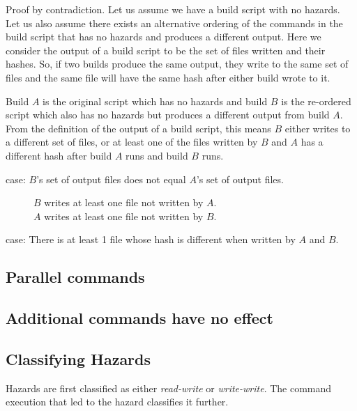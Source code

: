 
Proof by contradiction.  Let us assume we have a build script with no hazards.  Let us also assume there exists an alternative ordering of the commands in the build script that has no hazards
and produces a different output.  Here we consider the output of a build script to be the set of files written and their hashes.  So, if two builds produce the same output, they write to the same set of files and the same file will have the same hash after either build wrote to it.

Build $A$ is the original script which has no hazards and build $B$ is the re-ordered script which also has no hazards but produces a different output from build $A$.  From the definition of the output of a build script, this means $B$ either writes to a different set of files, or at least one of the files written by $B$ and $A$ has a different hash after build $A$ runs and build $B$ runs.

\begin{description}
\item [case: $B$'s set of output files does not equal $A$'s set of output files.]
  \begin{description}
  \item [$B$ writes at least one file not written by $A$.]  
  \item [$A$ writes at least one file not written by $B$.]
  \end{description}
  
\item [case: There is at least 1 file whose hash is different when written by $A$ and $B$.]
\end{description}


\subsection{Parallel commands}
\label{sec:proof:parallel}

\subsection{Additional commands have no effect}
\label{sec:proof:additional}

\subsection{Classifying Hazards}
\label{sec:proof:classify_hazard}

Hazards are first classified as either \emph{read-write} or \emph{write-write}.  The command execution that led to the hazard classifies it further.

